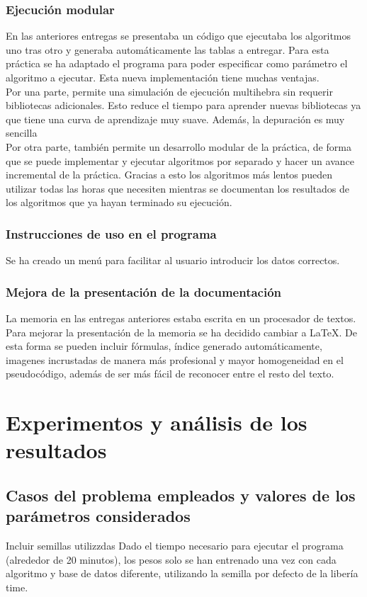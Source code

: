 \documentclass[12pt, spanish]{article}
\begin{document}
\subsubsection{Ejecución modular}
En las anteriores entregas se presentaba un código que ejecutaba los algoritmos uno tras otro y generaba automáticamente las tablas a entregar. Para esta práctica se ha adaptado el programa para poder especificar como parámetro el algoritmo a ejecutar. Esta nueva implementación tiene muchas ventajas. \\
Por una parte, permite una simulación de ejecución multihebra sin requerir bibliotecas adicionales. Esto reduce el tiempo para aprender nuevas bibliotecas ya que tiene una curva de aprendizaje muy suave. Además, la depuración es muy sencilla  \\
Por otra parte, también permite un desarrollo modular de la práctica, de forma que se puede implementar y ejecutar algoritmos por separado y hacer un avance incremental de la práctica. Gracias a esto los algoritmos más lentos pueden utilizar todas las horas que necesiten mientras se documentan los resultados de los algoritmos que ya hayan terminado su ejecución. \\ 
\subsubsection{Instrucciones de uso en el programa}
Se ha creado un menú para facilitar al usuario introducir los datos correctos. 
\subsubsection{Mejora de la presentación de la documentación}
La memoria en las entregas anteriores estaba escrita en un procesador de textos. Para mejorar la presentación de la memoria se ha decidido cambiar a LaTeX. De esta forma se pueden incluir fórmulas, índice generado automáticamente, imagenes incrustadas de manera más profesional y mayor homogeneidad en el pseudocódigo, además de ser más fácil de reconocer entre el resto del texto. \\

\pagebreak

\section{Experimentos y análisis de los resultados}
\subsection{Casos del problema empleados y valores de los parámetros considerados}
Incluir semillas utilizzdas
Dado el tiempo necesario para ejecutar el programa (alrededor de 20 minutos), los pesos solo se han entrenado una vez con cada algoritmo y base de datos diferente, utilizando la semilla por defecto de la libería time. 
\end{document}
